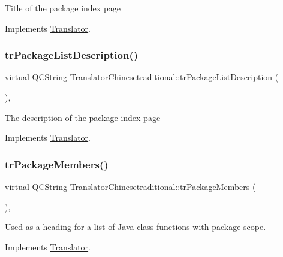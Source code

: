 Title of the package index page 

Implements \mbox{\hyperlink{class_translator}{Translator}}.

\mbox{\label{class_translator_chinesetraditional_ab4f562c3bfac8511ccd149ca98ef9415}} 
\subsubsection{\texorpdfstring{trPackageListDescription()}{trPackageListDescription()}}
{\footnotesize\ttfamily virtual \mbox{\hyperlink{class_q_c_string}{Q\+C\+String}} Translator\+Chinesetraditional\+::tr\+Package\+List\+Description (\begin{DoxyParamCaption}{ }\end{DoxyParamCaption})\hspace{0.3cm}{\ttfamily [inline]}, {\ttfamily [virtual]}}

The description of the package index page 

Implements \mbox{\hyperlink{class_translator}{Translator}}.

\mbox{\label{class_translator_chinesetraditional_aa67be8f3476106a7ffc1a07a66ff4189}} 
\subsubsection{\texorpdfstring{trPackageMembers()}{trPackageMembers()}}
{\footnotesize\ttfamily virtual \mbox{\hyperlink{class_q_c_string}{Q\+C\+String}} Translator\+Chinesetraditional\+::tr\+Package\+Members (\begin{DoxyParamCaption}{ }\end{DoxyParamCaption})\hspace{0.3cm}{\ttfamily [inline]}, {\ttfamily [virtual]}}

Used as a heading for a list of Java class functions with package scope. 

Implements \mbox{\hyperlink{class_translator}{Translator}}.

